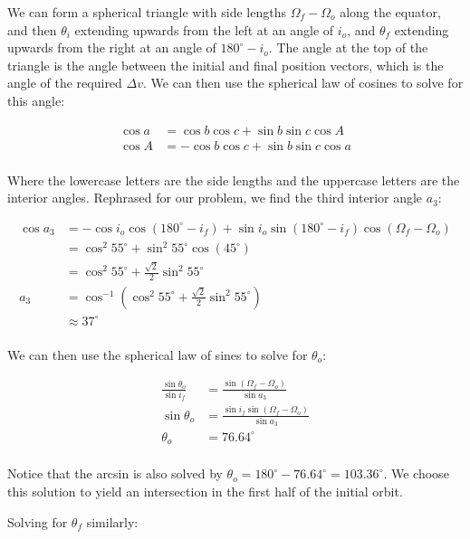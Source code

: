 We can form a spherical triangle with side lengths $\Omega_f - \Omega_o$ along the equator, and then $\theta_i$ extending upwards from the left at an angle of $i_o$, and $\theta_f$ extending upwards from the right at an angle of $180^\circ-i_o$. The angle at the top of the triangle is the angle between the initial and final position vectors, which is the angle of the required $\Delta v$. We can then use the spherical law of cosines to solve for this angle:

\begin{align*}
    \cos a &= \cos b \cos c + \sin b \sin c \cos A \\
    \cos A &= - \cos b \cos c + \sin b \sin c \cos a \\
\end{align*}

Where the lowercase letters are the side lengths and the uppercase letters are the interior angles. Rephrased for our problem, we find the third interior angle $a_3$:

\begin{align*}
    \cos a_3 &= - \cos i_o \cos (180^\circ - i_f) + \sin i_o \sin (180^\circ - i_f) \cos(\Omega_f - \Omega_o) \\
    &= \cos^2 55^\circ + \sin^2 55^\circ \cos(45^\circ) \\
    &= \cos^2 55^\circ + \frac{\sqrt{2}}{2} \sin^2 55^\circ \\
    a_3 &= \cos^{-1} \left( \cos^2 55^\circ + \frac{\sqrt{2}}{2} \sin^2 55^\circ \right) \\
    &\approx 37^\circ \\
\end{align*}

We can then use the spherical law of sines to solve for $\theta_o$:

\begin{align*}
    \frac{\sin\theta_o}{\sin i_f} &= \frac{\sin(\Omega_f - \Omega_o)}{\sin a_3} \\
    \sin\theta_o &= \frac{\sin i_f \sin(\Omega_f - \Omega_o)}{\sin a_3} \\
    \theta_o &= 76.64^\circ \\
\end{align*}

Notice that the arcsin is also solved by $\theta_o = 180^\circ - 76.64^\circ = 103.36^\circ$. We choose this solution to yield an intersection in the first half of the initial orbit.

Solving for $\theta_f$ similarly:


